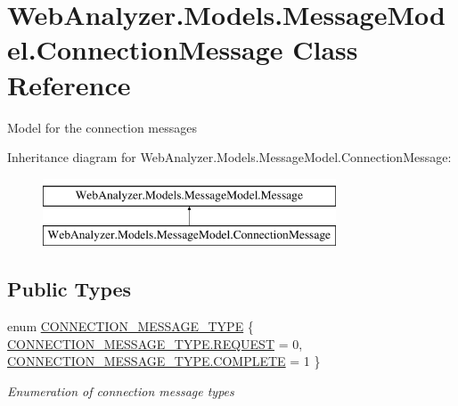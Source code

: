 \hypertarget{class_web_analyzer_1_1_models_1_1_message_model_1_1_connection_message}{}\section{Web\+Analyzer.\+Models.\+Message\+Model.\+Connection\+Message Class Reference}
\label{class_web_analyzer_1_1_models_1_1_message_model_1_1_connection_message}


Model for the connection messages  


Inheritance diagram for Web\+Analyzer.\+Models.\+Message\+Model.\+Connection\+Message\+:\begin{figure}[H]
\begin{center}
\leavevmode
\includegraphics[height=2.000000cm]{class_web_analyzer_1_1_models_1_1_message_model_1_1_connection_message}
\end{center}
\end{figure}
\subsection*{Public Types}
\begin{DoxyCompactItemize}
\item 
enum \hyperlink{class_web_analyzer_1_1_models_1_1_message_model_1_1_connection_message_a0b8ebc456d3aed9c51235f2a1a1a1cdb}{C\+O\+N\+N\+E\+C\+T\+I\+O\+N\+\_\+\+M\+E\+S\+S\+A\+G\+E\+\_\+\+T\+Y\+P\+E} \{ \hyperlink{class_web_analyzer_1_1_models_1_1_message_model_1_1_connection_message_a0b8ebc456d3aed9c51235f2a1a1a1cdbaad6c35880c58d97c03d60a6ad0f23737}{C\+O\+N\+N\+E\+C\+T\+I\+O\+N\+\_\+\+M\+E\+S\+S\+A\+G\+E\+\_\+\+T\+Y\+P\+E.\+R\+E\+Q\+U\+E\+S\+T} = 0, 
\hyperlink{class_web_analyzer_1_1_models_1_1_message_model_1_1_connection_message_a0b8ebc456d3aed9c51235f2a1a1a1cdba3de44296982e58199afc513a715b12ba}{C\+O\+N\+N\+E\+C\+T\+I\+O\+N\+\_\+\+M\+E\+S\+S\+A\+G\+E\+\_\+\+T\+Y\+P\+E.\+C\+O\+M\+P\+L\+E\+T\+E} = 1
 \}\begin{DoxyCompactList}\small\item\em Enumeration of connection message types \end{DoxyCompactList}
\end{DoxyCompactItemize}
